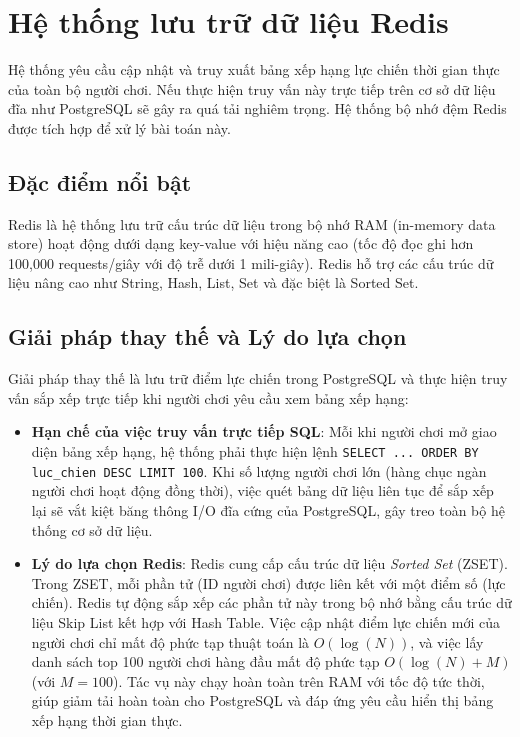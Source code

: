 \documentclass[../Project.tex]{subfiles}
\begin{document}
\section{Hệ thống lưu trữ dữ liệu Redis}
\label{sec:tech_redis}
Hệ thống yêu cầu cập nhật và truy xuất bảng xếp hạng lực chiến thời gian thực của toàn bộ người chơi. Nếu thực hiện truy vấn này trực tiếp trên cơ sở dữ liệu đĩa như PostgreSQL sẽ gây ra quá tải nghiêm trọng. Hệ thống bộ nhớ đệm Redis \cite{carlson2013redis} được tích hợp để xử lý bài toán này.

\subsection{Đặc điểm nổi bật}
Redis là hệ thống lưu trữ cấu trúc dữ liệu trong bộ nhớ RAM (in-memory data store) hoạt động dưới dạng key-value với hiệu năng cao (tốc độ đọc ghi hơn 100,000 requests/giây với độ trễ dưới 1 mili-giây). Redis hỗ trợ các cấu trúc dữ liệu nâng cao như String, Hash, List, Set và đặc biệt là Sorted Set.

\subsection{Giải pháp thay thế và Lý do lựa chọn}
Giải pháp thay thế là lưu trữ điểm lực chiến trong PostgreSQL và thực hiện truy vấn sắp xếp trực tiếp khi người chơi yêu cầu xem bảng xếp hạng:
\begin{itemize}
    \item \textbf{Hạn chế của việc truy vấn trực tiếp SQL}: Mỗi khi người chơi mở giao diện bảng xếp hạng, hệ thống phải thực hiện lệnh \texttt{SELECT ... ORDER BY luc\_chien DESC LIMIT 100}. Khi số lượng người chơi lớn (hàng chục ngàn người chơi hoạt động đồng thời), việc quét bảng dữ liệu liên tục để sắp xếp lại sẽ vắt kiệt băng thông I/O đĩa cứng của PostgreSQL, gây treo toàn bộ hệ thống cơ sở dữ liệu.
    \item \textbf{Lý do lựa chọn Redis}: Redis cung cấp cấu trúc dữ liệu \textit{Sorted Set} (ZSET). Trong ZSET, mỗi phần tử (ID người chơi) được liên kết với một điểm số (lực chiến). Redis tự động sắp xếp các phần tử này trong bộ nhớ bằng cấu trúc dữ liệu Skip List kết hợp với Hash Table. Việc cập nhật điểm lực chiến mới của người chơi chỉ mất độ phức tạp thuật toán là $O(\log(N))$, và việc lấy danh sách top 100 người chơi hàng đầu mất độ phức tạp $O(\log(N) + M)$ (với $M=100$). Tác vụ này chạy hoàn toàn trên RAM với tốc độ tức thời, giúp giảm tải hoàn toàn cho PostgreSQL và đáp ứng yêu cầu hiển thị bảng xếp hạng thời gian thực.
\end{itemize}
\end{document}
